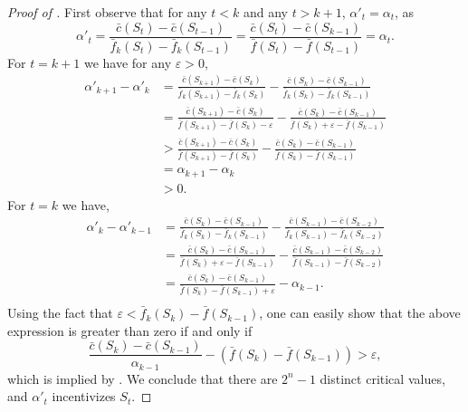 \documentclass[11pt]{article}
\newcommand{\eps}{\varepsilon}
\newcommand{\feq}{\bar{f}}
\newcommand{\ceq}{\bar{c}}
\begin{document}
\begin{proof}[Proof of ]
    First observe that for any $t < k$ and any $t>k+1$, $\alpha'_t = \alpha_t$, as
    $$
    \alpha'_t 
    =
    \frac{\ceq(S_t) - \ceq(S_{t-1})}{\feq_k(S_t) - \feq_k(S_{t-1})} 
    =
    \frac{\ceq(S_t) - \ceq(S_{k-1})}{\feq(S_t) - \feq(S_{t-1})} 
    =
    \alpha_t.
    $$  
    For $t=k+1$ we have for any $\eps >0$,
    \begin{align*}
        \alpha'_{k+1}  - \alpha'_k
        &=
        \frac{\ceq(S_{k+1}) - \ceq(S_{k})}{\feq_k(S_{k+1}) - \feq_k(S_{k})} 
        - 
        \frac{\ceq(S_{k}) - \ceq(S_{k-1})}{\feq_k(S_{k}) - \feq_k(S_{k-1})} \\
        &=
        \frac{\ceq(S_{k+1}) - \ceq(S_{k})}{\feq(S_{k+1}) - \feq(S_{k}) - \eps} 
        - 
        \frac{\ceq(S_{k}) - \ceq(S_{k-1})}{\feq(S_{k}) + \eps - \feq(S_{k-1})} \\
        &>
        \frac{\ceq(S_{k+1}) - \ceq(S_{k})}{\feq(S_{k+1}) - \feq(S_{k})} 
        - 
        \frac{\ceq(S_{k}) - \ceq(S_{k-1})}{\feq(S_{k}) - \feq(S_{k-1})} \\
        &=
        \alpha_{k+1}  - \alpha_k \\
        &>
        0.
    \end{align*}
    For $t=k$ we have,
    \begin{align*}
        \alpha'_k  - \alpha'_{k-1}
        &=
        \frac{\ceq(S_k) - \ceq(S_{k-1})}{\feq_k(S_k) - \feq_k(S_{k-1})} 
        - 
        \frac{\ceq(S_{k-1}) - \ceq(S_{k-2})}{\feq_k(S_{k-1}) - \feq_k(S_{k-2})} \\
        &=
        \frac{\ceq(S_k) - \ceq(S_{k-1})}{\feq(S_k) + \eps - \feq(S_{k-1})} 
        - 
        \frac{\ceq(S_{k-1}) - \ceq(S_{k-2})}{\feq(S_{k-1}) - \feq(S_{k-2})} \\
        &=
        \frac{\ceq(S_k) - \ceq(S_{k-1})}{\feq(S_k) - \feq(S_{k-1}) + \eps} 
        - 
        \alpha_{k-1}.\\
    \end{align*}
    Using the fact that $\eps < \feq_k(S_k) - \feq(S_{k-1})$, one can easily show that the above expression is greater than zero if and only if 
    $$
    \frac{\ceq(S_k) - \ceq(S_{k-1})}{ \alpha_{k-1}} - (\feq(S_k) - \feq(S_{k-1})) > \eps,
    $$
    which is implied by .
    We conclude that there are $2^n-1$ distinct critical values, and $\alpha'_t$ incentivizes $S_t$.


\end{proof}
\end{document}
